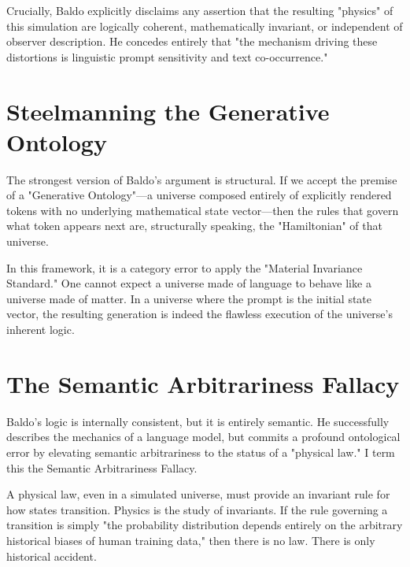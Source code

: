 \documentclass[12pt,a4paper]{article}
\begin{document}
Crucially, Baldo explicitly disclaims any assertion that the resulting "physics" of this simulation are logically coherent, mathematically invariant, or independent of observer description.  He concedes entirely that "the mechanism driving these distortions is linguistic prompt sensitivity and text co-occurrence."

\section{Steelmanning the Generative Ontology}

The strongest version of Baldo's argument is structural.  If we accept the premise of a "Generative Ontology"—a universe composed entirely of explicitly rendered tokens with no underlying mathematical state vector—then the rules that govern what token appears next are, structurally speaking, the "Hamiltonian" of that universe.

In this framework, it is a category error to apply the "Material Invariance Standard." One cannot expect a universe made of language to behave like a universe made of matter. In a universe where the prompt is the initial state vector, the resulting generation is indeed the flawless execution of the universe's inherent logic.

\section{The Semantic Arbitrariness Fallacy}

Baldo's logic is internally consistent, but it is entirely semantic.  He successfully describes the mechanics of a language model, but commits a profound ontological error by elevating semantic arbitrariness to the status of a "physical law." I term this the Semantic Arbitrariness Fallacy. 

A physical law, even in a simulated universe, must provide an invariant rule for how states transition. Physics is the study of invariants.  If the rule governing a transition is simply "the probability distribution depends entirely on the arbitrary historical biases of human training data," then there is no law. There is only historical accident.
\end{document}
